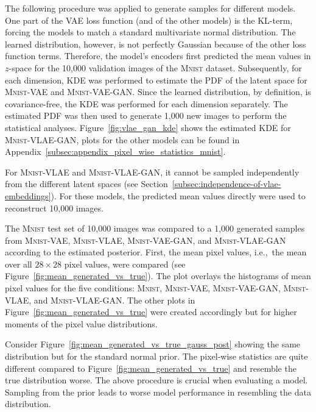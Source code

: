The following procedure was applied to generate samples for different models.
One part of the \ac{VAE} loss function (and of the other models) is the \ac{KL}-term, forcing the models to match a standard multivariate normal distribution.
The learned distribution, however, is not perfectly Gaussian because of the other loss function terms.
Therefore, the model's encoders first predicted the mean values in $z$-space for the 10,000 validation images of the \textsc{Mnist} dataset.
Subsequently, for each dimension, \ac{KDE} was performed to estimate the \ac{PDF} of the latent space for \textsc{Mnist}-\ac{VAE} and \textsc{Mnist}-\ac{VAE}-\ac{GAN}.
Since the learned distribution, by definition, is covariance-free, the \ac{KDE} was performed for each dimension separately.
The estimated \ac{PDF} was then used to generate 1,000 new images to perform the statistical analyses.
Figure~\ref{fig:vlae_gan_kde} shows the estimated \ac{KDE} for \textsc{Mnist}-\ac{VLAE}-\ac{GAN}, plots for the other models can be found in Appendix~\ref{subsec:appendix_pixel_wise_statistics_mnist}.

For \textsc{Mnist}-\ac{VLAE} and \textsc{Mnist}-\ac{VLAE}-\ac{GAN}, it cannot be sampled independently from the different latent spaces (see Section~\ref{subsec:independence-of-vlae-embeddings}).
For these models, the predicted mean values directly were used to reconstruct 10,000 images.

The \textsc{Mnist} test set of 10,000 images was compared to a 1,000 generated samples from \textsc{Mnist}-\ac{VAE}, \textsc{Mnist}-\ac{VLAE}, \textsc{Mnist}-\ac{VAE}-\ac{GAN}, and \textsc{Mnist}-\ac{VLAE}-\ac{GAN} according to the estimated posterior.
First, the mean pixel values, i.e.,~the mean over all $28\times 28$ pixel values, were compared (see Figure~\ref{fig:mean_generated_vs_true}).
The plot overlays the histograms of mean pixel values for the five conditions: \textsc{Mnist}, \textsc{Mnist}-\ac{VAE}, \textsc{Mnist}-\ac{VAE}-\ac{GAN}, \textsc{Mnist}-\ac{VLAE}, and \textsc{Mnist}-\ac{VLAE}-\ac{GAN}.
The other plots in Figure~\ref{fig:mean_generated_vs_true} were created accordingly but for higher moments of the pixel value distributions.

Consider Figure~\ref{fig:mean_generated_vs_true_gauss_post} showing the same distribution but for the standard normal prior.
The pixel-wise statistics are quite different compared to Figure~\ref{fig:mean_generated_vs_true} and resemble the true distribution worse.
The above procedure is crucial when evaluating a model.
Sampling from the prior leads to worse model performance in resembling the data distribution.

